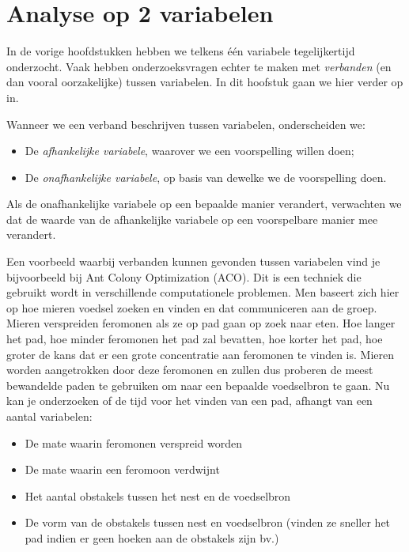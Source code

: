 \chapter{Analyse op 2 variabelen}
\label{ch:analyse2var}

In de vorige hoofdstukken hebben we telkens één variabele tegelijkertijd onderzocht. Vaak hebben onderzoeksvragen echter te maken met \emph{verbanden} (en dan vooral oorzakelijke) tussen variabelen. In dit hoofstuk gaan we hier verder op in.

Wanneer we een verband beschrijven tussen variabelen, onderscheiden we:

\begin{itemize}
  \item De \emph{afhankelijke variabele}, waarover we een voorspelling willen doen;
  \item De \emph{onafhankelijke variabele}, op basis van dewelke we de voorspelling doen.
\end{itemize}

Als de onafhankelijke variabele op een bepaalde manier verandert, verwachten we dat de waarde van de afhankelijke variabele op een voorspelbare manier mee verandert.

\begin{example}
  Een voorbeeld waarbij verbanden kunnen gevonden tussen variabelen vind je bijvoorbeeld bij Ant Colony Optimization (ACO). Dit is een techniek die gebruikt wordt in verschillende computationele problemen. Men baseert zich hier op hoe mieren voedsel zoeken en  vinden en dat communiceren aan de groep. Mieren verspreiden feromonen als ze op pad gaan op zoek naar eten. Hoe langer het pad, hoe minder feromonen het pad zal bevatten, hoe korter het pad, hoe groter de kans dat er een grote concentratie aan feromonen te vinden is. Mieren worden aangetrokken door deze feromonen en zullen dus proberen de meest bewandelde paden te gebruiken om naar een bepaalde voedselbron te gaan. Nu kan je onderzoeken of de tijd voor het vinden van een pad, afhangt van een aantal variabelen:

  \begin{itemize}
    \item De mate waarin feromonen verspreid worden
    \item De mate waarin een feromoon verdwijnt
    \item Het aantal obstakels tussen het nest en de voedselbron
    \item De vorm van de obstakels tussen nest en voedselbron (vinden ze sneller het pad indien er geen hoeken aan de obstakels zijn bv.)
  \end{itemize}
\end{example}

